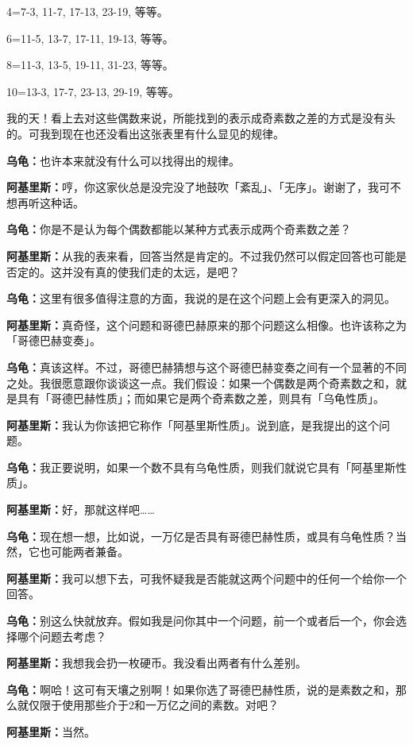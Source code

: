 \documentclass[
  12pt,
  twoside,
  openright,
  oldfontcommands,
]{memoir}
\newcommand{\dialogname}[1]{{\heifamily\bfseries #1}}
\begin{document}
4=7-3, 11-7, 17-13, 23-19, 等等。

6=11-5, 13-7, 17-11, 19-13, 等等。

8=11-3, 13-5, 19-11, 31-23, 等等。

10=13-3, 17-7, 23-13, 29-19, 等等。

我的天！看上去对这些偶数来说，所能找到的表示成奇素数之差的方式是没有头的。可我到现在也还没看出这张表里有什么显见的规律。

\dialogname{乌龟：}也许本来就没有什么可以找得出的规律。

\dialogname{阿基里斯：}哼，你这家伙总是没完没了地鼓吹「紊乱」、「无序」。谢谢了，我可不想再听这种话。

\dialogname{乌龟：}你是不是认为每个偶数都能以某种方式表示成两个奇素数之差？

\dialogname{阿基里斯：}从我的表来看，回答当然是肯定的。不过我仍然可以假定回答也可能是否定的。这并没有真的使我们走的太远，是吧？

\dialogname{乌龟：}这里有很多值得注意的方面，我说的是在这个问题上会有更深入的洞见。

\dialogname{阿基里斯：}真奇怪，这个问题和哥德巴赫原来的那个问题这么相像。也许该称之为「哥德巴赫变奏」。

\dialogname{乌龟：}真该这样。不过，哥德巴赫猜想与这个哥德巴赫变奏之间有一个显著的不同之处。我很愿意跟你谈谈这一点。我们假设：如果一个偶数是两个奇素数之和，就是具有「哥德巴赫性质」；而如果它是两个奇素数之差，则具有「乌龟性质」。

\dialogname{阿基里斯：}我认为你该把它称作「阿基里斯性质」。说到底，是我提出的这个问题。

\dialogname{乌龟：}我正要说明，如果一个数不具有乌龟性质，则我们就说它具有「阿基里斯性质」。

\dialogname{阿基里斯：}好，那就这样吧\ldots\ldots{}

\dialogname{乌龟：}现在想一想，比如说，一万亿是否具有哥德巴赫性质，或具有乌龟性质？当然，它也可能两者兼备。

\dialogname{阿基里斯：}我可以想下去，可我怀疑我是否能就这两个问题中的任何一个给你一个回答。

\dialogname{乌龟：}别这么快就放弃。假如我是问你其中一个问题，前一个或者后一个，你会选择哪个问题去考虑？

\dialogname{阿基里斯：}我想我会扔一枚硬币。我没看出两者有什么差别。

\dialogname{乌龟：}啊哈！这可有天壤之别啊！如果你选了哥德巴赫性质，说的是素数之和，那么就仅限于使用那些介于2和一万亿之间的素数。对吧？

\dialogname{阿基里斯：}当然。
\end{document}

